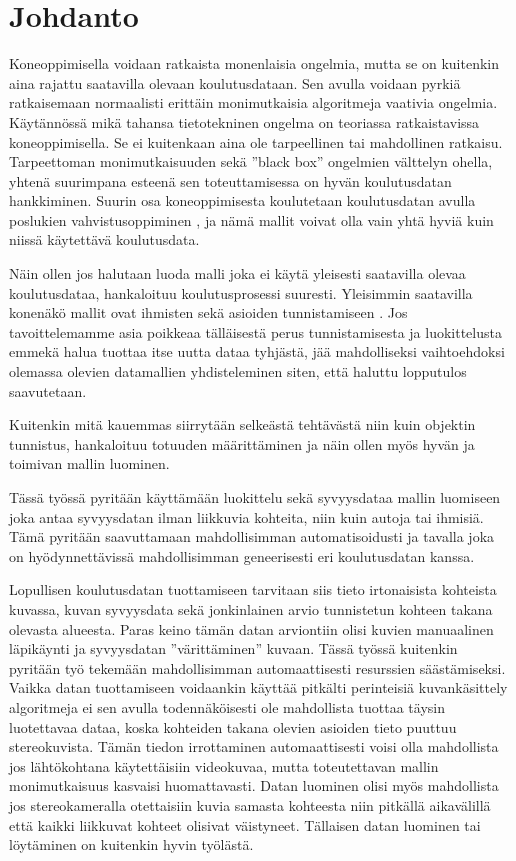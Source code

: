 \chapter{Johdanto}%
\label{ch:johdanto}

Koneoppimisella voidaan ratkaista monenlaisia ongelmia, mutta se on kuitenkin aina rajattu saatavilla olevaan koulutusdataan.
Sen avulla voidaan pyrkiä ratkaisemaan normaalisti erittäin monimutkaisia algoritmeja vaativia ongelmia.
Käytännössä mikä tahansa tietotekninen ongelma on teoriassa ratkaistavissa koneoppimisella.
Se ei kuitenkaan aina ole tarpeellinen tai mahdollinen ratkaisu.
Tarpeettoman monimutkaisuuden sekä ”black box” ongelmien välttelyn ohella,
yhtenä suurimpana esteenä sen toteuttamisessa on hyvän koulutusdatan hankkiminen.
Suurin osa koneoppimisesta koulutetaan koulutusdatan avulla poslukien vahvistusoppiminen \cite{alma9911523590705973},
ja nämä mallit voivat olla vain yhtä hyviä kuin niissä käytettävä koulutusdata.

Näin ollen jos halutaan luoda malli joka ei käytä yleisesti saatavilla olevaa koulutusdataa,
hankaloituu koulutusprosessi suuresti.
Yleisimmin saatavilla konenäkö mallit ovat ihmisten sekä asioiden tunnistamiseen \cite{kagglecomvis}.
Jos tavoittelemamme asia poikkeaa tälläisestä perus tunnistamisesta ja luokittelusta 
emmekä halua tuottaa itse uutta dataa tyhjästä,
jää mahdolliseksi vaihtoehdoksi olemassa olevien datamallien yhdisteleminen siten,
että haluttu lopputulos saavutetaan.

Kuitenkin mitä kauemmas siirrytään selkeästä tehtävästä niin kuin objektin tunnistus,
hankaloituu totuuden määrittäminen ja näin ollen myös hyvän ja toimivan mallin luominen.

Tässä työssä pyritään käyttämään luokittelu sekä syvyysdataa mallin luomiseen joka antaa syvyysdatan
ilman liikkuvia kohteita, niin kuin autoja tai ihmisiä.
Tämä pyritään saavuttamaan mahdollisimman automatisoidusti
ja tavalla joka on hyödynnettävissä mahdollisimman geneerisesti eri koulutusdatan kanssa.

Lopullisen koulutusdatan tuottamiseen tarvitaan siis tieto irtonaisista kohteista kuvassa,
kuvan syvyysdata sekä jonkinlainen arvio tunnistetun kohteen takana olevasta alueesta.
Paras keino tämän datan arviontiin olisi kuvien manuaalinen läpikäynti ja syvyysdatan ”värittäminen” kuvaan.
Tässä työssä kuitenkin pyritään työ tekemään mahdollisimman automaattisesti resurssien säästämiseksi.
Vaikka datan tuottamiseen voidaankin käyttää pitkälti perinteisiä kuvankäsittely algoritmeja
ei sen avulla todennäköisesti ole mahdollista tuottaa täysin luotettavaa dataa,
koska kohteiden takana olevien asioiden tieto puuttuu stereokuvista.
Tämän tiedon irrottaminen automaattisesti voisi olla mahdollista jos lähtökohtana käytettäisiin videokuvaa,
mutta toteutettavan mallin monimutkaisuus kasvaisi huomattavasti.
Datan luominen olisi myös mahdollista jos stereokameralla otettaisiin kuvia samasta kohteesta niin pitkällä aikavälillä että kaikki liikkuvat kohteet olisivat väistyneet.
Tällaisen datan luominen tai löytäminen on kuitenkin hyvin työlästä. 

